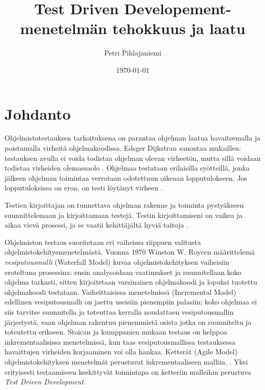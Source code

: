 \documentclass[finnish]{tktltiki2}
\title{Test Driven Developement-menetelmän tehokkuus ja laatu}
\author{Petri Pihlajaniemi}
\date{\today}
\theoremstyle{definition}
\theoremstyle{remark}
\begin{document}


\maketitle        %
\makeabstract     %

\tableofcontents  %


\mainmatter       %




\section{Johdanto}


Ohjelmistotestauksen tarkoituksena on parantaa ohjelman laatua havaitsemalla ja poistamalla virheitä ohjelmakoodissa. Edsger Dijkstran sanontaa mukaillen: testauksen avulla ei voida todistaa ohjelman olevan virheetön, mutta sillä voidaan todistaa virheiden olemassaolo \cite{Randell69}. Ohjelmaa testataan erilaisilla syötteillä, jonka jälkeen ohjelman toimintaa verrataan odotettuun oikeaan lopputulokseen. Jos lopputuloksissa on eroa, on testi löytänyt virheen \cite{Muccini08}.


Testien kirjoittajan on tunnettava ohjelman rakenne ja toiminta pystyäkseen suunnittelemaan ja kirjoittamaan testejä. Testin kirjoittamiseni on vaikea ja aikaa vievä prosessi, ja se vaatii kehittäjältä hyviä taitoja \cite{Whittaker00}.

Ohjelmiston testaus suoritetaan eri vaiheissa riippuen valitusta ohjelmistokehitysmenetelmästä. Vuonna 1970 Winston W. Roycen määrittelemä \emph{vesiputousmalli} (Waterfall Model) kuvaa ohjelmistokehityksen vaiheisiin eroteltuna prosessina: ensin analysoidaan vaatimukset ja suunnitellaan koko ohjelma tarkasti, sitten kirjoitetaan varsinainen ohjelmakoodi ja lopuksi tuotettu ohjelmakoodi testataan. Vaiheittaisissa menetelmissä (Incremental Model) edellinen vesiputousmalli on jaettu useisiin pienempiin palasiin; koko ohjelmaa ei siis tarvitse suunnitella ja toteuttaa kerralla noudattaen vesiputousmallin järjestystä, vaan ohjelman rakentuu pienemmistä osista jotka on suunniteltu ja toteutettu erikseen. Stoican ja kumppanien mukaan testaus on helppoa inkrementaalisissa menetelmissä, kun taas vesiputousmallissa testauksessa havaittujen virheiden korjaaminen voi olla hankaa. Ketterät (Agile Model) ohjelmistokehityksen menetelmät perustuvat inkrementaaliseen malliin. \cite{Stoica13}. Yksi erityisesti testaamiseen keskittyvät toimintapa on ketteriin malleihin perustuva \emph{Test Driven Development}. \cite{Crispin06}
\end{document}
